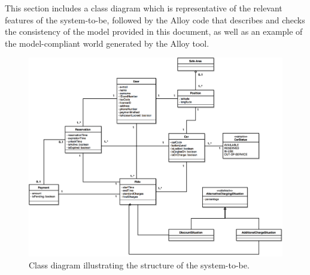 This section includes a class diagram which is representative of the relevant features of the system-to-be, followed by the Alloy code that describes and checks the consistency of the model provided in this document, as well as an example of the model-compliant world generated by the Alloy tool.

\begin{figure}[H]
\begin{center}
		\includegraphics[width=\textwidth]{./pictures/class_diagram.png}
		\caption{Class diagram illustrating the structure of the system-to-be.}
		\label{class_diagram}
\end{center}
\end{figure}



